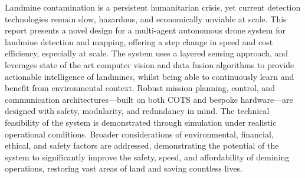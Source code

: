 Landmine contamination is a persistent humanitarian crisis, yet current detection technologies remain slow, hazardous, and economically unviable at scale. This report presents a novel design for a multi-agent autonomous drone system for landmine detection and mapping, offering a step change in  speed and cost efficiency, especially at scale. The system uses a layered sensing approach, and leverages state of the art computer vision and data fusion algorithms to provide actionable intelligence of landmines, whilst being able to continuously learn and benefit from environmental context. Robust mission planning, control, and communication architectures—built on both COTS and bespoke hardware—are designed with safety, modularity, and redundancy in mind. The technical feasibility of the system is demonstrated through simulation under realistic operational conditions. Broader considerations of environmental, financial, ethical, and safety factors are addressed, demonstrating the potential of the system to significantly improve the safety, speed, and affordability of demining operations, restoring vast areas of land and saving countless lives.